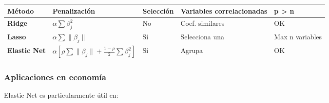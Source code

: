 \documentclass[
  doc,
  floatsintext,
  longtable,
  a4paper,
  nolmodern,
  notxfonts,
  notimes,
  12pt,
  colorlinks=true,linkcolor=blue,citecolor=blue,urlcolor=blue]{apa7}
\newcounter{none} %
\begin{document}
{\def\LTcaptype{none} %
\begin{longtable}[]{@{}
  >{\raggedright\arraybackslash}p{}
  >{\raggedright\arraybackslash}p{}
  >{\raggedright\arraybackslash}p{}
  >{\raggedright\arraybackslash}p{}
  >{\raggedright\arraybackslash}p{}@{}}
\toprule\noalign{}
\begin{minipage}[b]{\linewidth}\raggedright
Método
\end{minipage} & \begin{minipage}[b]{\linewidth}\raggedright
Penalización
\end{minipage} & \begin{minipage}[b]{\linewidth}\raggedright
Selección
\end{minipage} & \begin{minipage}[b]{\linewidth}\raggedright
Variables correlacionadas
\end{minipage} & \begin{minipage}[b]{\linewidth}\raggedright
p \textgreater{} n
\end{minipage} \\
\midrule\noalign{}
\endhead
\bottomrule\noalign{}
\endlastfoot
\textbf{Ridge} & \(\alpha \sum \beta_j^2\) & No & Coef. similares &
OK \\
\textbf{Lasso} & \(\alpha \sum \|\beta_j\|\) & Sí & Selecciona una & Max
n variables \\
\textbf{Elastic Net} &
\(\alpha[\rho \sum \|\beta_j\| + \frac{1-\rho}{2}\sum \beta_j^2]\) & Sí
& Agrupa & OK \\
\end{longtable}
}

\subsubsection{Aplicaciones en
economía}\label{aplicaciones-en-economuxeda-3}

Elastic Net es particularmente útil en:
\end{document}
